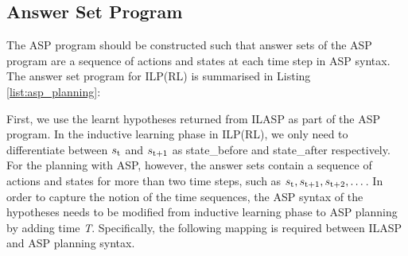 \subsection{Answer Set Program}
\label{subsec:answer_set_program}
The ASP program should be constructed such that answer sets of the ASP program are a sequence of actions and states at each time step in ASP syntax. 
The answer set program for ILP(RL) is summarised in Listing \ref{list:asp_planning}:

First, we use the learnt hypotheses returned from ILASP as part of the ASP program.
In the inductive learning phase in ILP(RL), we only need to differentiate between $s\textsubscript{t}$ and $s\textsubscript{t+1}$ as \textsf{state\_before} and \textsf{state\_after} respectively.
For the planning with ASP, however, the answer sets contain a sequence of actions and states for more than two time steps, such as $s\textsubscript{t}, s\textsubscript{t+1}, s\textsubscript{t+2}, \dots$.
In order to capture the notion of the time sequences, the ASP syntax of the hypotheses needs to be modified from inductive learning phase to ASP planning by 
adding time \textit{T}. Specifically, the following mapping is required between ILASP and ASP planning syntax.

